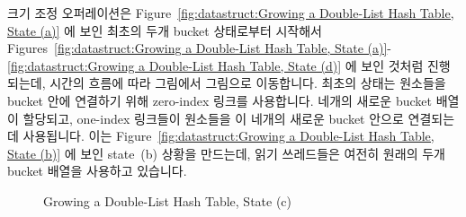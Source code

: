 크기 조정 오퍼레이션은
Figure~\ref{fig:datastruct:Growing a Double-List Hash Table, State (a)} 에 보인
최초의 두개 bucket 상태로부터 시작해서
Figures~\ref{fig:datastruct:Growing a Double-List Hash Table, State (a)}-\ref{fig:datastruct:Growing a Double-List Hash Table, State (d)}
에 보인 것처럼 진행되는데, 시간의 흐름에 따라 그림에서 그림으로 이동합니다.
최초의 상태는 원소들을 bucket 안에 연결하기 위해 zero-index 링크를 사용합니다.
네개의 새로운 bucket 배열이 할당되고, one-index 링크들이 원소들을 이 네개의
새로운 bucket 안으로 연결되는데 사용됩니다.
이는
Figure~\ref{fig:datastruct:Growing a Double-List Hash Table, State (b)} 에 보인
state~(b) 상황을 만드는데, 읽기 쓰레드들은 여전히 원래의 두개 bucket 배열을
사용하고 있습니다.

\begin{figure}[tb]
\centering
{}
\caption{Growing a Double-List Hash Table, State (c)}
\label{fig:datastruct:Growing a Double-List Hash Table, State (c)}
\end{figure}

